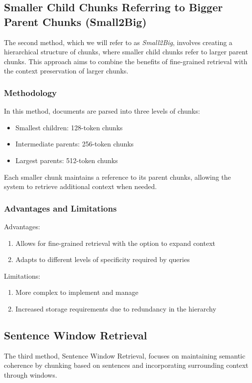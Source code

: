 \subsection{Smaller Child Chunks Referring to Bigger Parent Chunks (Small2Big)}\label{subsec:smaller-child-chunks-referring-to-bigger-parent-chunks}
The second method, which we will refer to as \textit{Small2Big}, involves creating a hierarchical structure of chunks, where smaller child chunks refer to larger parent chunks.
This approach aims to combine the benefits of fine-grained retrieval with the context preservation of larger chunks.
\subsubsection{Methodology}
In this method, documents are parsed into three levels of chunks:
\begin{itemize}
    \item Smallest children: 128-token chunks
    \item Intermediate parents: 256-token chunks
    \item Largest parents: 512-token chunks
\end{itemize}
Each smaller chunk maintains a reference to its parent chunks, allowing the system to retrieve additional context when needed.
\subsubsection{Advantages and Limitations}
Advantages:
\begin{enumerate}
    \item Allows for fine-grained retrieval with the option to expand context
    \item Adapts to different levels of specificity required by queries
\end{enumerate}
Limitations:
\begin{enumerate}
    \item More complex to implement and manage
    \item Increased storage requirements due to redundancy in the hierarchy
\end{enumerate}
\subsection{Sentence Window Retrieval}\label{subsec:sentence-window-retrieval}
The third method, Sentence Window Retrieval, focuses on maintaining semantic coherence by chunking based on sentences and incorporating surrounding context through windows.
